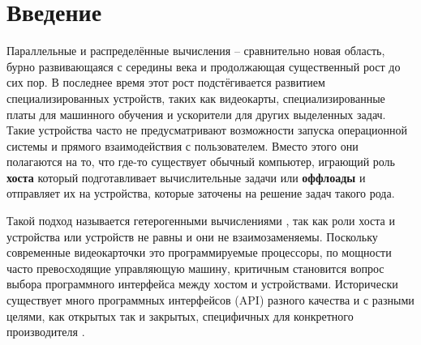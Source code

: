 \chapter*{Введение}                         %

\setcounter{XXcnt}{20}

Параллельные и распределённые вычисления -- сравнительно новая область, бурно развивающаяся с середины  века\cite{FirstComputers} и продолжающая существенный рост до сих пор. В последнее время этот рост подстёгивается развитием специализированных устройств, таких как видеокарты, специализированные платы для машинного обучения и ускорители для других выделенных задач. Такие устройства часто не предусматривают возможности запуска операционной системы и прямого взаимодействия с пользователем. Вместо этого они полагаются на то, что где-то существует обычный компьютер, играющий роль \textbf{хоста} который подготавливает вычислительные задачи или \textbf{оффлоады} и отправляет их на устройства, которые заточены на решение задач такого рода.

Такой подход называется гетерогенными вычислениями \cite{shan2006heterogeneous}, так как роли хоста и устройства или устройств не равны и они не взаимозаменяемы. Поскольку современные видеокарточки это программируемые процессоры, по мощности часто превосходящие управляющую машину, критичным становится вопрос выбора программного интерфейса между хостом и устройствами. Исторически существует много программных интерфейсов (API) разного качества и с разными целями, как открытых так и закрытых, специфичных для конкретного производителя \cite{HeteroSurvey}.

